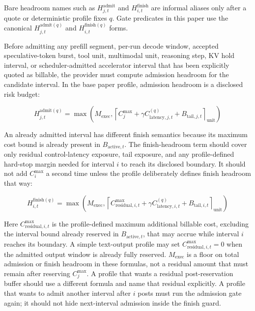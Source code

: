 \documentclass[11pt]{article}
\begin{document}
Bare headroom names such as \(H_{j,t}^{\mathrm{admit}}\) and \(H_{i,t}^{\mathrm{finish}}\) are informal aliases only after a quote or deterministic profile fixes \(q\). Gate predicates in this paper use the canonical \(H_{j,t}^{\mathrm{admit}(q)}\) and \(H_{i,t}^{\mathrm{finish}(q)}\) forms.

Before admitting any prefill segment, per-run decode window, accepted speculative-token burst, tool unit, multimodal unit, reasoning step, KV hold interval, or scheduler-admitted accelerator interval that has been explicitly quoted as billable, the provider must compute admission headroom for the candidate interval. In the base paper profile, admission headroom is a disclosed risk budget:

\[
H_{j,t}^{\mathrm{admit}(q)} =
\max\left(
M_{\mathrm{exec}},
\left\lceil
C_j^{\max}
+ \gamma C_{\mathrm{latency},j,t}^{(q)}
+ B_{\mathrm{tail},j,t}
\right\rceil_{\mathrm{unit}}
\right)
\]

An already admitted interval has different finish semantics because its maximum cost bound is already present in \(B_{\mathrm{active},t}\). The finish-headroom term should cover only residual control-latency exposure, tail exposure, and any profile-defined hard-stop margin needed for interval \(i\) to reach its disclosed boundary. It should not add \(C_i^{\max}\) a second time unless the profile deliberately defines finish headroom that way:

\[
H_{i,t}^{\mathrm{finish}(q)} =
\max\left(
M_{\mathrm{exec}},
\left\lceil
C_{\mathrm{residual},i,t}^{\max}
+ \gamma C_{\mathrm{latency},i,t}^{(q)}
+ B_{\mathrm{tail},i,t}
\right\rceil_{\mathrm{unit}}
\right)
\]

Here \(C_{\mathrm{residual},i,t}^{\max}\) is the profile-defined maximum additional billable cost, excluding the interval bound already reserved in \(B_{\mathrm{active},t}\), that may accrue while interval \(i\) reaches its boundary. A simple text-output profile may set \(C_{\mathrm{residual},i,t}^{\max}=0\) when the admitted output window is already fully reserved. \(M_{\mathrm{exec}}\) is a floor on total admission or finish headroom in these formulas, not a residual amount that must remain after reserving \(C_j^{\max}\). A profile that wants a residual post-reservation buffer should use a different formula and name that residual explicitly. A profile that wants to admit another interval after \(i\) posts must run the admission gate again; it should not hide next-interval admission inside the finish guard.
\end{document}
